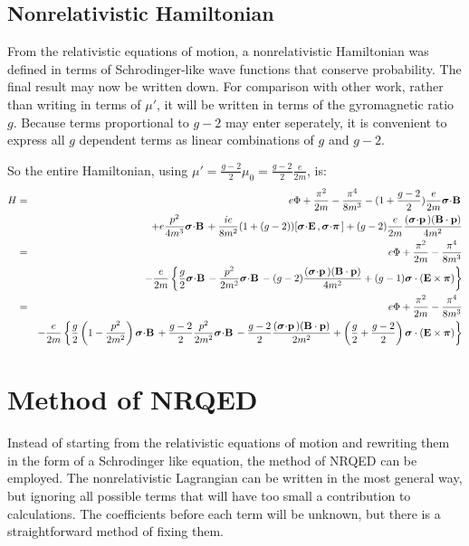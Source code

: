\subsection*{Nonrelativistic Hamiltonian}
From the relativistic equations of motion, a nonrelativistic Hamiltonian was defined in terms of Schrodinger-like wave functions that conserve probability.  The final result may now be written down.  For comparison with other work, rather than writing in terms of $\mu'$, it will be written in terms of the gyromagnetic ratio $g$.  Because terms proportional to $g-2$ may enter seperately, it is convenient to express all $g$ dependent terms as linear combinations of $g$ and $g-2$. 

So the entire Hamiltonian, using $\mu' = \frac{g-2}{2}\mu_0 = \frac{g-2}{2}\frac{e}{2m} $, is:
\begin{eqnarray*}
H	&=&
		e\Phi  + \frac{ \pi^2}{2m} -\frac{\pi^4}{8m^3} - (1 + \frac{g-2}{2})\frac{e}{2m} \sigdot{B}	\\
	&&
		 + e \frac{p^2}{4m^3}\sigdot{B} + \frac{ie}{8m^2}(1 + (g-2))[\sigdot{E},\sigdotg{\pi}]
		 + (g-2) \frac{e}{2m}  \frac{ (\sigdot{p}) (\v{B} \cdot \v{p}) }{4m^2}  	\\
	&=&
		e\Phi  + \frac{ \pi^2}{2m} -\frac{\pi^4}{8m^3} 
	\\&&
		- \frac{e}{2m} \left\{
			\frac{g}{2}\sigdot{B} - \frac{p^2}{2m^2}\sigdot{B}
			- (g-2) \frac{ (\sigdot{p}) (\v{B} \cdot \v{p}) }{4m^2} 
			+(g-1) \gv{\sigma} \cdot (\v{E} \times \gv{\pi})
		\right \}	\\
	&=&
		e\Phi  + \frac{ \pi^2}{2m} -\frac{\pi^4}{8m^3} 
	\\&&
		- \frac{e}{2m} \left\{
			\frac{g}{2} \left( 1 - \frac{p^2}{2m^2} \right) \sigdot{B} + \frac{g-2}{2} \frac{p^2}{2m^2}\sigdot{B}
			- \frac{g-2}{2} \frac{ (\sigdot{p}) (\v	{B} \cdot \v{p}) }{2m^2} 
			+\left(\frac{g}{2} + \frac{g-2}{2}\right) \gv{\sigma} \cdot (\v{E} \times \gv{\pi})
		\right \}	\\	
\end{eqnarray*}

			


 
 
 

\section{Method of NRQED}
Instead of starting from the relativistic equations of motion and rewriting them in the form of a Schrodinger like equation, the method of NRQED can be employed.  The nonrelativistic Lagrangian can be written in the most general way, but ignoring all possible terms that will have too small a contribution to calculations.  The coefficients before each term will be unknown, but there is a straightforward method of fixing them.

